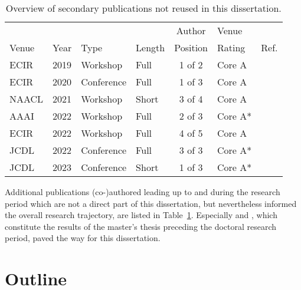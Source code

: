 \begin{table}[tb]
\centering
  \caption{Overview of secondary publications not reused in this dissertation.}
  \label{tab:secondarypublicationoverview}
  \begin{tabular}{llllclr}
    \hline
    \ & \ & \ & \ & Author & Venue & \ \\
    Venue & Year & Type & Length & Position & Rating & Ref. \\
    \hline
    ECIR & 2019 & Workshop & Full & 1 of 2 & Core A & \cite{Saier2019} \\
    ECIR & 2020 & Conference & Full & 1 of 3 & Core A & \cite{Saier2020a} \\
    NAACL & 2021 & Workshop & Short & 3 of 4 & Core A & \cite{Krause2021} \\
    AAAI & 2022 & Workshop & Full & 2 of 3 & Core A* & \cite{Shapiro2022} \\
    ECIR & 2022 & Workshop & Full & 4 of 5 & Core A & \cite{Faerber2022bir} \\
    JCDL & 2022 & Conference & Full & 3 of 3 & Core A* & \cite{Nishioka2022} \\
    JCDL & 2023 & Conference & Short & 1 of 3 & Core A* & \cite{Saier2023cocon} \\
    \hline
    \end{tabular}
\end{table}

Additional publications (co-)authored leading up to and during the research period which are not a direct part of this dissertation, but nevertheless informed the overall research trajectory, are listed in Table~\ref{tab:secondarypublicationoverview}. Especially \cite{Saier2019} and \cite{Krause2021}, which constitute the results of the master's thesis preceding the doctoral research period, paved the way for this dissertation.

\section{Outline}
\Blindtext[1]

